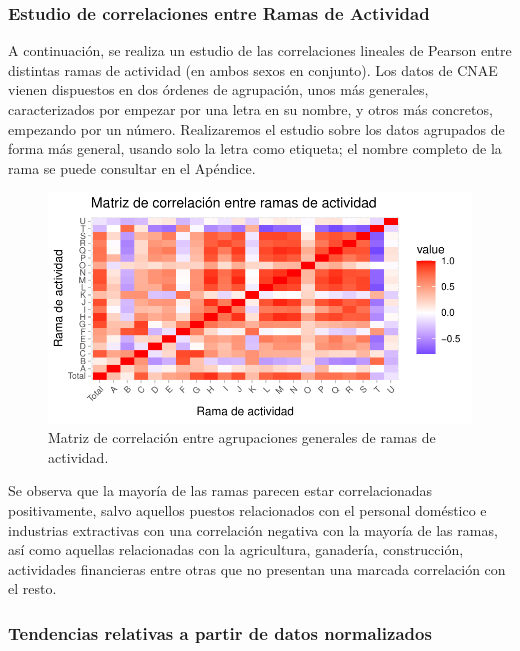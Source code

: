 \documentclass[Universitat de
València,article,submit,moreauthors,pdftex]{Definitions/mdpi}
\begin{document}
\subsubsection{\texorpdfstring{\textbf{Estudio de correlaciones entre
Ramas de
Actividad}}{Estudio de correlaciones entre Ramas de Actividad}}\label{estudio-de-correlaciones-entre-ramas-de-actividad}

A continuación, se realiza un estudio de las correlaciones lineales de
Pearson entre distintas ramas de actividad (en ambos sexos en conjunto).
Los datos de CNAE vienen dispuestos en dos órdenes de agrupación, unos
más generales, caracterizados por empezar por una letra en su nombre, y
otros más concretos, empezando por un número. Realizaremos el estudio
sobre los datos agrupados de forma más general, usando solo la letra
como etiqueta; el nombre completo de la rama se puede consultar en el
Apéndice.

\begin{figure}

{\centering \includegraphics{ProyectoAED2024_files/figure-latex/unnamed-chunk-40-1} 

}

\caption{Matriz de correlación entre agrupaciones generales de ramas de actividad.}\label{fig:unnamed-chunk-40}
\end{figure}

Se observa que la mayoría de las ramas parecen estar correlacionadas
positivamente, salvo aquellos puestos relacionados con el personal
doméstico e industrias extractivas con una correlación negativa con la
mayoría de las ramas, así como aquellas relacionadas con la agricultura,
ganadería, construcción, actividades financieras entre otras que no
presentan una marcada correlación con el resto.

\subsubsection{\texorpdfstring{\textbf{Tendencias relativas a partir de
datos
normalizados}}{Tendencias relativas a partir de datos normalizados}}\label{tendencias-relativas-a-partir-de-datos-normalizados}
\end{document}
